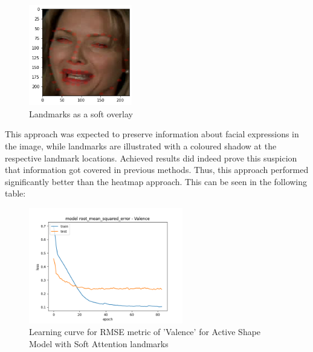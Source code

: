\begin{figure}[H]
  \begin{center}
  \includegraphics[angle=0, width=0.4\textwidth]{Figures/landmarks_as_softOverlay.png}
  \caption{Landmarks as a soft overlay}
  \label{fig:LandmarksSoftOverlay}
  \end{center}
\end{figure}

This approach was expected to preserve information about facial expressions in the image, while landmarks are illustrated with a coloured shadow at the respective landmark locations. Achieved results did indeed prove this suspicion that information got covered in previous methods. Thus, this approach performed significantly better than the heatmap approach. This can be seen in the following table:

\begin{figure}[H]
  \begin{center}
  \includegraphics[angle=0, width=0.6\textwidth]{Figures/rmse_out1_softAttention.png}
  \caption{Learning curve for RMSE metric of 'Valence' for Active Shape Model with Soft Attention landmarks}
  \label{fig:LandmarksSoftAttention}
  \end{center}
\end{figure}

